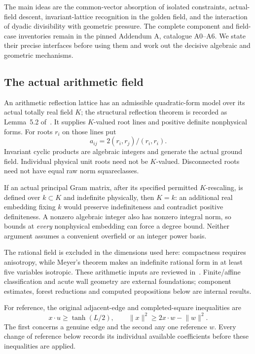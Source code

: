 \documentclass[11pt]{article}
\theoremstyle{remark}\newtheorem{remark}[theorem]{Remark}
\numberwithin{equation}{section}
\newcommand{\norm}[1]{\lVert #1\rVert}
\begin{document}
The main ideas are the common-vector absorption of isolated constraints,
actual-field descent, invariant-lattice recognition in the golden field,
and the interaction of dyadic divisibility with geometric pressure. The
complete component and field-case inventories remain in the pinned
Addendum A, catalogue A0--A6. We state their precise interfaces before
using them and work out the decisive algebraic and geometric mechanisms.

\subsection{The actual arithmetic field}\label{arith:sec:scope}
An arithmetic reflection lattice has an admissible quadratic-form
model over its actual totally real field $K$; the structural reflection
theorem is recorded as Lemma~5.2 of~\cite{ABSW}. It supplies $K$-valued
root lines and positive definite nonphysical forms. For roots $r_i$ on
those lines put
 \[
 a_{ij}=2(r_i,r_j)/(r_i,r_i).
\]
Invariant cyclic products are algebraic integers and generate the
actual ground field. Individual physical unit roots need not be
 $K$-valued. Disconnected roots need not have equal raw norm squareclasses.

If an actual principal Gram matrix, after its specified permitted
 $K$-rescaling, is defined over $k\subset K$ and indefinite physically,
then $K=k$: an additional real embedding fixing $k$ would preserve
indefiniteness and contradict positive definiteness.
A nonzero algebraic integer also has nonzero integral norm, so bounds
at \emph{every} nonphysical embedding can force a degree bound.
Neither argument assumes a convenient overfield or an integer power basis.

The rational field is excluded in the dimensions used here: compactness
requires anisotropy, while Meyer's theorem makes an indefinite rational
form in at least five variables isotropic. These arithmetic inputs are
reviewed in~\cite{Belolipetsky}. Finite/affine classification and acute
wall geometry are external foundations; component estimates, forest
reductions and computed propositions below are internal results.


For reference, the original adjacent-edge and completed-square inequalities are
\begin{equation}\label{arith:eq:edge}
 x\cdot u\ge\tanh(L/2),\qquad
 \norm{x}^2\ge2x\cdot w-\norm{w}^2.
\end{equation}
The first concerns a genuine edge and the second any one reference $w$.
Every change of reference below records its individual available
coefficients before these inequalities are applied.
\end{document}
